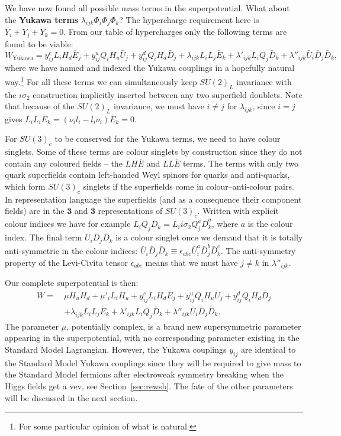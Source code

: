 \documentclass[notes.tex]{subfiles}
\begin{document}
We have now found all possible mass terms in the superpotential. What about the {\bf Yukawa terms} $\lambda_{ijk}\Phi_i\Phi_j\Phi_k$? The hypercharge requirement here is $Y_i + Y_j + Y_k = 0$. From our table of hypercharges only the following terms are found to be viable:
\[W_\text{Yukawa}=y^e_{ij}L_iH_d \bar{E}_j + y^u_{ij}Q_iH_u\bar{U}_j +  y^d_{ij}Q_iH_d\bar{D}_j+ \lambda_{ijk} L_iL_j\bar{E}_k + \lambda'_{ijk} L_iQ_j\bar{D}_k + \lambda''_{ijk}\bar{U}_i\bar{D}_j\bar{D}_k,\]
where we have named and indexed the Yukawa couplings in a hopefully natural way.\footnote{For some particular opinion of what is natural.} 
For all these terms we can simultaneously keep $SU(2)_L$ invariance with the $i\sigma_2$ construction implicitly inserted between any two superfield doublets.  Note that because of the $SU(2)_L$  invariance, we must have $i\ne j$ for  $\lambda_{ijk}$, since $i=j$ gives $ L_iL_i\bar{E}_k =(\nu_i l_i- l_i\nu_i)\bar E_k=0$.

For $SU(3)_c$ to be conserved for the Yukawa terms, we need to have colour singlets. Some of these terms are colour singlets by construction since they do not contain any coloured fields -- the $LH\bar{E}$ and $LL\bar{E}$ terms. The terms with only two quark superfields contain left-handed Weyl spinors for quarks and anti-quarks, which form $SU(3)_c$ singlets if the superfields come in colour--anti-colour pairs. In representation language the superfields (and as a consequence their component fields) are in the $\mathbf 3$ and $\mathbf{\bar 3}$ representations of $SU(3)_c$. Written with explicit  colour indices we have for example $L_i Q_j \bar{D}_k= L_i i\sigma_2 Q_j^a \bar{D}_k^a$, where $a$ is the colour index. The final term $\bar{U}_i\bar{D}_j\bar{D}_k$ is a colour singlet once we demand that it is totally anti-symmetric in the colour indices: $\bar{U}_i\bar{D}_j\bar{D}_k\equiv\epsilon_{abc}\bar{U}_i^a\bar{D}_j^b\bar{D}_k^c$. The anti-symmetry property of the Levi-Civita tensor $\epsilon_{abc}$ means that we must have $j\ne k$ in $ \lambda''_{ijk}$.

Our complete superpotential is then:
\begin{equation}
\label{eq:supolag}
\begin{split}
W =\ & \mu H_u H_d + \mu'_i L_iH_u + y^e_{ij}L_iH_d \bar{E}_j + y^u_{ij}Q_iH_u\bar{U}_j +  y^d_{ij}Q_iH_d\bar{D}_j \\
&+ \lambda_{ijk} L_iL_j\bar{E}_k + \lambda'_{ijk} L_iQ_j\bar{D}_k + \lambda''_{ijk}\bar{U}_i\bar{D}_j\bar{D}_k.
\end{split}
\end{equation}
The parameter $\mu$, potentially complex, is a brand new supersymmetric parameter appearing in the superpotential, with no corresponding parameter existing in the Standard Model Lagrangian. However, the Yukawa couplings $y_{ij}$ are identical to the Standard Model Yukawa couplings since they will be required to give mass to the Standard Model fermions after electroweak symmetry breaking when the Higgs fields get a vev, see Section~\ref{sec:rewsb}. The fate of the other parameters will be discussed in the next section.
\end{document}
